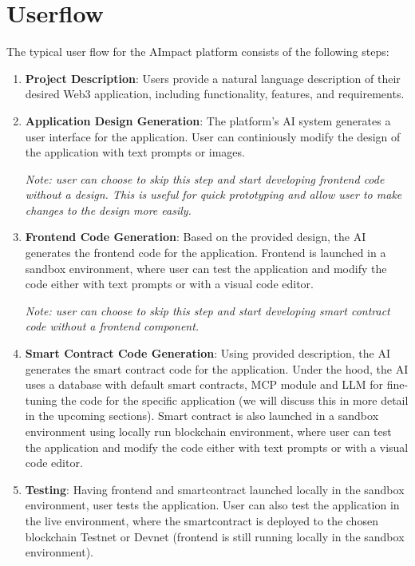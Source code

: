 \documentclass[12pt,a4paper]{article}
\begin{document}
\section{Userflow}
\label{sec:userflow}

The typical user flow for the AImpact platform consists of the following steps:

\begin{enumerate}
    \item \textbf{Project Description}: Users provide a natural language description of their desired Web3 application, including functionality, features, and requirements.
    
    \item \textbf{Application Design Generation}: The platform's AI system generates a user interface for the application. 
    User can continiously modify the design of the application with text prompts or images.
    
    \textit{Note: user can choose to skip this step and start developing frontend code without a design. 
    This is useful for quick prototyping and allow user to make changes to the design more easily.}
   
    \item \textbf{Frontend Code Generation}: 
    Based on the provided design, the AI generates the frontend code for the application. 
    Frontend is launched in a sandbox environment, where user can test the application and modify the code either with text prompts or with a visual code editor.
   
    \textit{Note: user can choose to skip this step and start developing smart contract code without a frontend component. }

    \item \textbf{Smart Contract Code Generation}: 
    Using provided description, the AI generates the smart contract code for the application. Under the hood, the AI uses a database with default smart contracts, MCP module and LLM for fine-tuning the code for the specific application (we will discuss this in more detail in the upcoming sections).
    Smart contract is also launched in a sandbox environment using locally run blockchain environment, where user can test the application and modify the code either with text prompts or with a visual code editor.
    

    \item \textbf{Testing}: 
    Having frontend and smartcontract launched locally in the sandbox environment, user tests the application.
    User can also test the application in the live environment, where the smartcontract is deployed to the chosen blockchain Testnet or Devnet (frontend is still running locally in the sandbox environment).
    

\end{enumerate}
\end{document}
